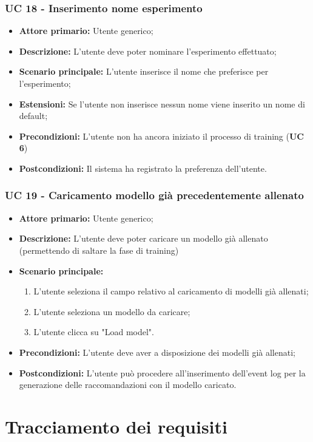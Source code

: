 \subsubsection{UC 18 - Inserimento nome esperimento}
\begin{itemize}
	\item \textbf{Attore primario:} Utente generico;
	\item \textbf{Descrizione:} L'utente deve poter nominare l'esperimento effettuato;
	\item \textbf{Scenario principale:} L'utente inserisce il nome che preferisce per l'esperimento;
	\item \textbf{Estensioni:} Se l'utente non inserisce nessun nome viene inserito un nome di default; 
	\item \textbf{Precondizioni:} L'utente non ha ancora iniziato il processo di training (\textbf{UC 6})
	\item \textbf{Postcondizioni:} Il sistema ha registrato la preferenza dell'utente.
\end{itemize}

\subsubsection{UC 19 - Caricamento modello già precedentemente allenato}
\begin{itemize}
	\item \textbf{Attore primario:} Utente generico;
	\item \textbf{Descrizione:} L'utente deve poter caricare un modello già allenato (permettendo di saltare la fase di training)
	\item \textbf{Scenario principale:}
		\begin{enumerate}
			\item L'utente seleziona il campo relativo al caricamento di modelli già allenati;
			\item L'utente seleziona un modello da caricare;
			\item L'utente clicca su "Load model".
		\end{enumerate}
	\item \textbf{Precondizioni:} L'utente deve aver a disposizione dei modelli già allenati; 
	\item \textbf{Postcondizioni:} L'utente può procedere all'inserimento dell'event log per la generazione delle raccomandazioni con il modello caricato.
\end{itemize}


\section{Tracciamento dei requisiti}


